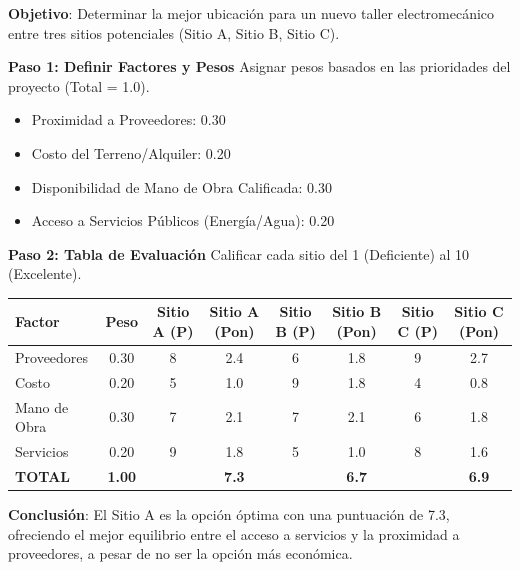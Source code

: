 \documentclass[../main]{subfiles}
\begin{document}
\textbf{Objetivo}: Determinar la mejor ubicación para un nuevo taller electromecánico entre tres sitios potenciales (Sitio A, Sitio B, Sitio C).

\textbf{Paso 1: Definir Factores y Pesos}
Asignar pesos basados en las prioridades del proyecto (Total = 1.0).
\begin{itemize}
    \item Proximidad a Proveedores: 0.30
    \item Costo del Terreno/Alquiler: 0.20
    \item Disponibilidad de Mano de Obra Calificada: 0.30
    \item Acceso a Servicios Públicos (Energía/Agua): 0.20
\end{itemize}

\textbf{Paso 2: Tabla de Evaluación}
Calificar cada sitio del 1 (Deficiente) al 10 (Excelente).

\begin{center}
\begin{tabular}{|l|c|c|c|c|c|c|c|}
\hline
\textbf{Factor} & \textbf{Peso} & \textbf{Sitio A (P)} & \textbf{Sitio A (Pon)} & \textbf{Sitio B (P)} & \textbf{Sitio B (Pon)} & \textbf{Sitio C (P)} & \textbf{Sitio C (Pon)} \\
\hline
Proveedores & 0.30 & 8 & 2.4 & 6 & 1.8 & 9 & 2.7 \\
Costo & 0.20 & 5 & 1.0 & 9 & 1.8 & 4 & 0.8 \\
Mano de Obra & 0.30 & 7 & 2.1 & 7 & 2.1 & 6 & 1.8 \\
Servicios & 0.20 & 9 & 1.8 & 5 & 1.0 & 8 & 1.6 \\
\hline
\textbf{TOTAL} & \textbf{1.00} & & \textbf{7.3} & & \textbf{6.7} & & \textbf{6.9} \\
\hline
\end{tabular}
\end{center}

\textbf{Conclusión}: El Sitio A es la opción óptima con una puntuación de 7.3, ofreciendo el mejor equilibrio entre el acceso a servicios y la proximidad a proveedores, a pesar de no ser la opción más económica.
\end{document}
